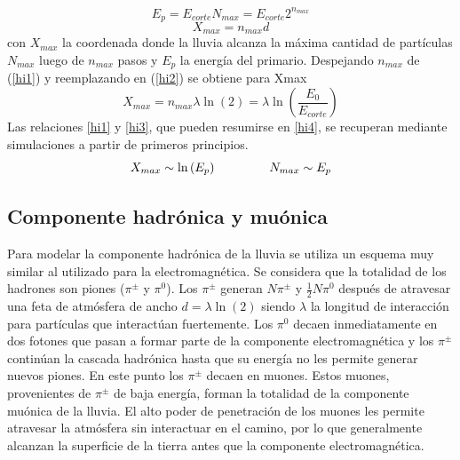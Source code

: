 %
\begin{equation}
\label{hi1}
E_p = E_{corte} N_{max} = E_{corte} 2^{n_{max}}
\end{equation}
%
\begin{equation}
\label{hi2}
X_{max}=n_{max} d
\end{equation}
%
con $X_{max}$ la coordenada donde la lluvia alcanza la máxima cantidad de partículas $N_{max}$ luego de $n_{max}$ pasos y $E_p$ la energía del primario.
Despejando $n_{max}$ de (\ref{hi1}) y reemplazando en (\ref{hi2}) se obtiene para Xmax
%
\begin{equation}
\label{hi3}
X_{max} = n_{max} \lambda \ln(2)=\lambda \ln\left(\frac{E_{0}}{E_{corte}}\right)
\end{equation}
%
Las relaciones \ref{hi1} y \ref{hi3}, que pueden resumirse en \ref{hi4}, se recuperan mediante simulaciones a partir de primeros principios.
%
\begin{equation}
\label{hi4}
X_{max} \sim \ln\left(E_{p}\right)
\hspace*{15mm}
N_{max} \sim E_p
\end{equation}
%

\subsection{Componente hadrónica y muónica}
Para modelar la componente hadrónica de la lluvia se utiliza un esquema muy similar al utilizado para la electromagnética.
Se considera que la totalidad de los hadrones son piones ($\pi^{\pm}$ y $\pi^{0}$). Los $\pi^{\pm}$ generan $N \pi^{\pm}$ y $\frac{1}{2}N \pi^{0}$ después de atravesar una feta de atmósfera de ancho $d=\lambda \ln(2)$ siendo $\lambda$ la longitud de interacción para partículas que interactúan fuertemente.
Los $\pi^{0}$ decaen inmediatamente en dos fotones que pasan a formar parte de la componente electromagnética y los $\pi^{\pm}$ continúan la cascada hadrónica hasta que su energía no les permite generar nuevos piones.
En este punto los $\pi^{\pm}$ decaen en muones.
Estos muones, provenientes de $\pi^{\pm}$ de baja energía, forman la totalidad de la componente muónica de la lluvia.
El alto poder de penetración de los muones les permite atravesar la atmósfera sin interactuar en el camino, por lo que generalmente alcanzan la superficie de la tierra antes que la componente electromagnética.

